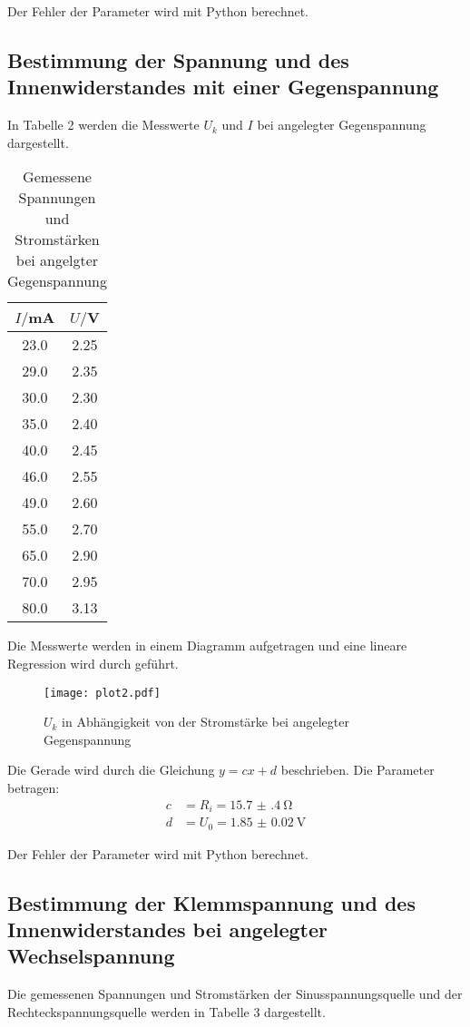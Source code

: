 Der Fehler der Parameter wird mit Python berechnet.


\subsection{Bestimmung der Spannung und des Innenwiderstandes mit einer Gegenspannung}

In Tabelle 2 werden die Messwerte $U_k$ und $I$ bei angelegter Gegenspannung dargestellt.

\begin{table}[H]
  \centering
  \caption{Gemessene Spannungen und Stromstärken bei angelgter Gegenspannung}
  \label{tab:gegenspannung}
  \begin{tabular}{c c}
    \toprule
    $I/$mA & $U/$V \\
    \midrule
    23.0  &  2.25 \\
    29.0  &  2.35 \\
    30.0  &  2.30 \\
    35.0  &  2.40 \\
    40.0  &  2.45 \\
    46.0  &  2.55 \\
    49.0  &  2.60 \\
    55.0  &  2.70 \\
    65.0  &  2.90 \\
    70.0  &  2.95 \\
    80.0  &  3.13 \\
    \bottomrule
  \end{tabular}
\end{table}

Die Messwerte werden in einem Diagramm aufgetragen und eine lineare Regression wird durch geführt.

\begin{figure}[H]
  \centering
  \texttt{[image: plot2.pdf]}
  \caption{$U_k$ in Abhängigkeit von der Stromstärke bei angelegter Gegenspannung }
  \label{fig:plot2}
\end{figure}

Die Gerade wird durch die Gleichung $y = cx + d$ beschrieben. Die Parameter betragen:
\begin{align*}
  c &= R_i = \SI{15.7(4)}{\ohm} \\
  d &= U_0 = \SI{1.85(2)}{\volt}
\end{align*}

Der Fehler der Parameter wird mit Python berechnet.


\subsection{Bestimmung der Klemmspannung und des Innenwiderstandes bei angelegter Wechselspannung}
Die gemessenen Spannungen und Stromstärken der Sinusspannungsquelle und der Rechteckspannungsquelle werden
in Tabelle 3 dargestellt.

